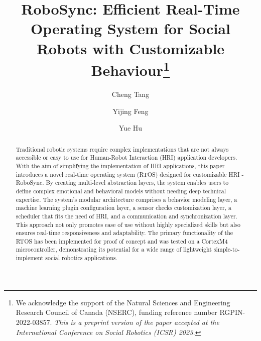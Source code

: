 \documentclass[runningheads]{llncs}
\begin{document}
%
\title{RoboSync: Efficient Real-Time Operating System for Social Robots with Customizable Behaviour\thanks{We acknowledge the support of the Natural Sciences and Engineering Research Council of Canada (NSERC), funding reference number RGPIN-2022-03857. \textit{This is a preprint version of the paper accepted at the International Conference on Social Robotics (ICSR) 2023.}}}
%
%
\author{Cheng Tang \and
Yijing Feng \and
Yue Hu}
%
%
%
\maketitle              %
%
\begin{abstract}
Traditional robotic systems require complex implementations that are not always accessible or easy to use for Human-Robot Interaction (HRI) application developers. With the aim of simplifying the implementation of HRI applications, this paper introduces a novel real-time operating system (RTOS) designed for customizable HRI - RoboSync. By creating multi-level abstraction layers, the system enables users to define complex emotional and behavioral models without needing deep technical expertise. The system's modular architecture comprises a behavior modeling layer, a machine learning plugin configuration layer, a sensor checks customization layer, a scheduler that fits the need of HRI, and a communication and synchronization layer. This approach not only promotes ease of use without highly specialized skills but also ensures real-time responsiveness and adaptability. The primary functionality of the RTOS has been implemented for proof of concept and was tested on a CortexM4 microcontroller, demonstrating its potential for a wide range of lightweight simple-to-implement social robotics applications.

\end{abstract}
%
%
%
\end{document}
